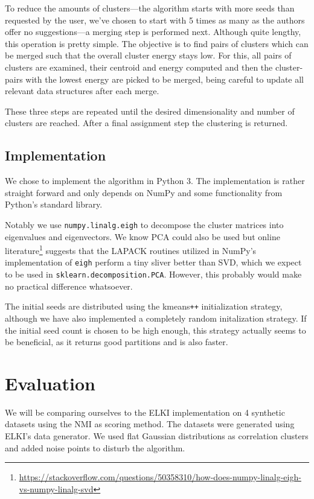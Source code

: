 \documentclass[english]{scrartcl}
\begin{document}
To reduce the amounts of clusters---the algorithm starts with more seeds than
requested by the user, we've chosen to start with 5 times as many as the
authors offer no suggestions---a merging step is performed next. Although quite
lengthy, this operation is pretty simple. The objective is to find pairs of
clusters which can be merged such that the overall cluster energy stays low.
For this, all pairs of clusters are examined, their centroid and energy
computed and then the cluster-pairs with the lowest energy are picked to be merged, being
careful to update all relevant data structures after each merge.

These three steps are repeated until the desired dimensionality and number of
clusters are reached. After a final assignment step the clustering is returned.


\subsection{Implementation}

We chose to implement the algorithm in Python 3. The implementation is rather straight
forward and only depends on NumPy and some functionality from Python's standard
library.

Notably we use \texttt{numpy.linalg.eigh} to decompose the cluster matrices
into eigenvalues and eigenvectors. We know PCA could also be used but online
literature\footnote{\url{https://stackoverflow.com/questions/50358310/how-does-numpy-linalg-eigh-vs-numpy-linalg-svd}}
suggests that the LAPACK routines utilized in NumPy's implementation of
\texttt{eigh} perform a tiny sliver better than SVD, which we expect to be used
in \texttt{sklearn.decomposition.PCA}.  However, this probably would make no
practical difference whatsoever.

The initial seeds are distributed using the kmeans\texttt{++} initialization strategy,
although we have also implemented a completely random initalization strategy.
If the initial seed count is chosen to be high enough, this strategy actually
seems to be beneficial, as it returns good partitions and is also faster.

\section{Evaluation}

We will be comparing ourselves to the ELKI implementation on 4 synthetic datasets
using the NMI as scoring method. The datasets were generated using ELKI's data generator.
We used flat Gaussian distributions as correlation clusters and added noise points
to disturb the algorithm.
\end{document}
